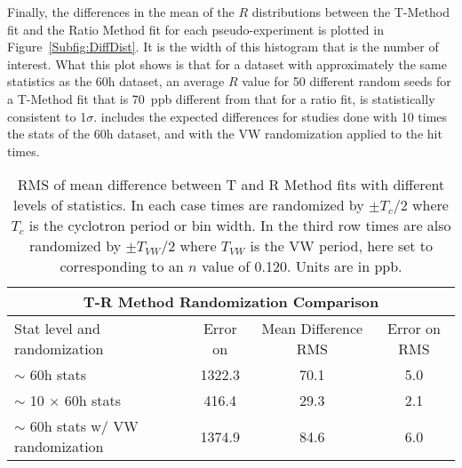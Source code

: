 
Finally, the differences in the mean of the $R$ distributions between the T-Method fit and the Ratio Method fit for each pseudo-experiment is plotted in Figure~\ref{Subfig:DiffDist}. It is the width of this histogram that is the number of interest. What this plot shows is that for a dataset with approximately the same statistics as the 60h dataset, an average $R$ value for 50 different random seeds for a T-Method fit that is \SI{70}{ppb} different from that for a ratio fit, is statistically consistent to 1$\sigma$.  includes the expected differences for studies done with 10 times the stats of the 60h dataset, and with the VW randomization applied to the hit times.




\begin{table}
\centering
\small
\renewcommand{\arraystretch}{1.2}
\begin{tabular*}{1\linewidth}{@{\extracolsep{\fill}}lccc}
  \hline
    \multicolumn{4}{c}{\textbf{T-R Method Randomization Comparison}} \\
  \hline\hline
    Stat level and randomization & Error on \R & Mean Difference RMS & Error on RMS \\
  \hline
    $\sim$ 60h stats & 1322.3 & 70.1 & 5.0 \\
    $\sim$ 10 $\times$ 60h stats & 416.4 & 29.3 & 2.1 \\
    $\sim$ 60h stats w/ VW randomization & 1374.9 & 84.6 & 6.0 \\
  \hline
\end{tabular*}
\caption[T-R Method randomization comparison]{RMS of mean difference between T and R Method fits with different levels of statistics. In each case times are randomized by $\pm T_{c}/2$ where $T_{c}$ is the cyclotron period or bin width. In the third row times are also randomized by $\pm T_{VW}/2$ where $T_{VW}$ is the VW period, here set to  corresponding to an $n$ value of 0.120. Units are in ppb.}
\label{tab:TRRandomizationComparison}
\end{table}



